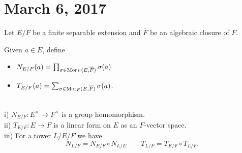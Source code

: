 \section{March 6, 2017}
Let $E/F$ be a finite separable extension and $\overline{F}$ be an algebraic closure of $F$.

\begin{defn}
	Given $a \in E$, define
		\begin{itemize}
			\item $N_{E/F}(a) = \prod_{\sigma \in \operatorname{Mor}_F(E, \overline{F})} \sigma(a)$ 
			\item $T_{E/F}(a) = \sum_{\sigma \in \operatorname{Mor}_F(E, \overline{F})} \sigma(a)$.
		\end{itemize}
\end{defn}

\begin{fact}
	~\\
	i) $N_{E/F}: E^{\times} \rightarrow F^{\times}$ is a group homomorphism. \\
	ii) $T_{E/F}: E \rightarrow F$ is a linear form on $E$ as an $F$-vector space. \\
	iii) For a tower $L/E/F$ we have 
		\[N_{L/F} = N_{E/F} \circ N_{L/E} \qquad T_{L/F} = T_{E/F} \circ T_{L/F}.\]
\end{fact}

